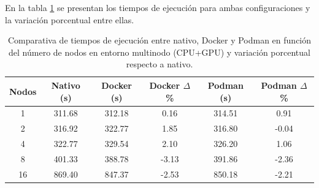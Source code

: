 En la tabla \ref{tab:multi-node_ubuntu_container_vs_native_gpu} se presentan los tiempos de ejecución para ambas configuraciones y la variación porcentual entre ellas.

\begin{table}[ht]
    \centering
    \begin{tabular}{|c|c|c|c|c|c|}
        \hline
        \textbf{Nodos} & \textbf{Nativo (s)} & \textbf{Docker (s)} & \textbf{Docker $\Delta$\%} & \textbf{Podman (s)} & \textbf{Podman $\Delta$\%} \\
        \hline
        1              & 311.68              & 312.18              & 0.16                       & 314.51              & 0.91                       \\
        2              & 316.92              & 322.77              & 1.85                       & 316.80              & -0.04                      \\
        4              & 322.77              & 329.54              & 2.10                       & 326.20              & 1.06                       \\
        8              & 401.33              & 388.78              & -3.13                      & 391.86              & -2.36                      \\
        16             & 869.40              & 847.37              & -2.53                      & 850.18              & -2.21                      \\
        \hline
    \end{tabular}
    \caption{Comparativa de tiempos de ejecución entre nativo, Docker y Podman en función del número de nodos en entorno multinodo (CPU+GPU) y variación porcentual respecto a nativo.}
    \label{tab:multi-node_ubuntu_container_vs_native_gpu}
\end{table}


